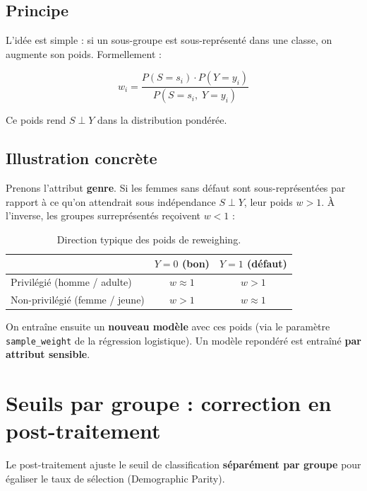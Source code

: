 \documentclass[11pt, a4paper]{article}
\begin{document}
\subsection{Principe}

L'id\'{e}e est simple : si un sous-groupe est sous-repr\'{e}sent\'{e} dans une classe, on augmente son poids. Formellement :

$$w_i = \frac{P(S = s_i) \cdot P(Y = y_i)}{P(S = s_i,\; Y = y_i)}$$

\noindent Ce poids rend $S \perp Y$ dans la distribution pond\'{e}r\'{e}e.

\subsection{Illustration concr\`{e}te}

Prenons l'attribut \textbf{genre}. Si les femmes sans d\'{e}faut sont sous-repr\'{e}sent\'{e}es par rapport \`{a} ce qu'on attendrait sous ind\'{e}pendance $S \perp Y$, leur poids $w > 1$. \`{A} l'inverse, les groupes surrepr\'{e}sent\'{e}s re\c{c}oivent $w < 1$ :

\begin{table}[H]
\centering
\begin{tabular}{lcc}
\toprule
& $Y = 0$ (bon) & $Y = 1$ (d\'{e}faut) \\
\midrule
Privil\'{e}gi\'{e} (homme / adulte) & $w \approx 1$ & $w > 1$ \\
Non-privil\'{e}gi\'{e} (femme / jeune) & $w > 1$ & $w \approx 1$ \\
\bottomrule
\end{tabular}
\caption{Direction typique des poids de reweighing.}
\end{table}

On entra\^{i}ne ensuite un \textbf{nouveau mod\`{e}le} avec ces poids (via le param\`{e}tre \texttt{sample\_weight} de la r\'{e}gression logistique). Un mod\`{e}le repondéré est entra\^{i}n\'{e} \textbf{par attribut sensible}.

\section{Seuils par groupe : correction en post-traitement}
\label{sec:postproc}

\begin{questionbox}
Le post-traitement ajuste le seuil de classification \textbf{s\'{e}par\'{e}ment par groupe} pour \'{e}galiser le taux de s\'{e}lection (Demographic Parity).
\end{questionbox}
\end{document}

